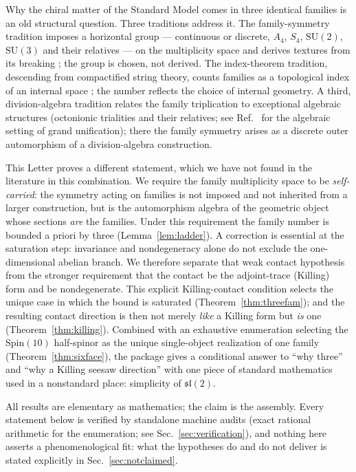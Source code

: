 \documentclass[
  aps,prd,superscriptaddress,nofootinbib,preprint
]{revtex4-2}
\theoremstyle{remark}
\newcommand{\Spin}{\mathrm{Spin}}
\newcommand{\SU}{\mathrm{SU}}
\begin{document}
Why the chiral matter of the Standard Model comes in three identical
families is an old structural question.  Three traditions address it.
The family-symmetry tradition imposes a horizontal group --- continuous
or discrete, $A_4$, $S_4$, $\SU(2)$, $\SU(3)$ and their relatives ---
on the multiplicity space and derives textures from its breaking
\cite{KingLuhn2013}; the group is chosen, not derived.  The
index-theorem tradition, descending from compactified string theory,
counts families as a topological index of an internal space
\cite{CandelasHorowitzStromingerWitten1985}; the number reflects the
choice of internal geometry.  A third, division-algebra tradition
relates the family triplication to exceptional algebraic structures
(octonionic trialities and their relatives; see
Ref.~\cite{BaezHuerta2010} for the algebraic setting of grand
unification); there the family symmetry arises as a discrete outer
automorphism of a division-algebra construction.

This Letter proves a different statement, which we have not found in
the literature in this combination.  We require the family multiplicity
space to be \emph{self-carried}: the symmetry acting on families is not
imposed and not inherited from a larger construction, but is the
automorphism algebra of the geometric object whose sections \emph{are}
the families.  Under this requirement the family number is bounded a
priori by three (Lemma~\ref{lem:ladder}).  A correction is essential at
the saturation step: invariance and nondegeneracy alone do not exclude
the one-dimensional abelian branch.  We therefore separate that weak
contact hypothesis from the stronger requirement that the contact be
the adjoint-trace (Killing) form and be nondegenerate.  This explicit
Killing-contact condition selects the unique case in which the bound is
saturated (Theorem~\ref{thm:threefam}); and the resulting contact
direction is then not merely \emph{like} a Killing form but \emph{is}
one (Theorem~\ref{thm:killing}).  Combined with an exhaustive
enumeration selecting the $\Spin(10)$ half-spinor as the unique
single-object realization of one family
(Theorem~\ref{thm:sixface}), the package gives a conditional answer to
``why three'' and ``why a Killing seesaw direction'' with one piece of
standard mathematics used in a nonstandard place: simplicity of
$\mathfrak{sl}(2)$.

All results are elementary as mathematics; the claim is the assembly.
Every statement below is verified by standalone machine audits (exact
rational arithmetic for the enumeration; see
Sec.~\ref{sec:verification}), and nothing here asserts a
phenomenological fit: what the hypotheses do and do not deliver is
stated explicitly in Sec.~\ref{sec:notclaimed}.
\end{document}
